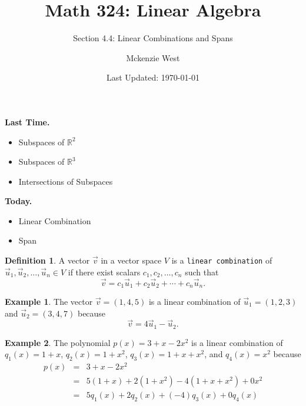 \documentclass{beamer}
\newcommand{\R}{\mathbb{R}}
\newcommand{\fn}{\insertframenumber}
\theoremstyle{definition}
\newtheorem*{defn}{Definition}
\newtheorem*{exa}{Example}
\renewcommand{\emph}[1]{{\color{blue}\texttt{#1}}}
\begin{document}
	\title{Math 324: Linear Algebra}
	\subtitle{Section 4.4: Linear Combinations and Spans}
	\author{Mckenzie West}
	\date{Last Updated: \today}
\begin{frame}
\maketitle
\end{frame}

\begin{frame}{\insertframenumber}
	\begin{block}{\textbf{Last Time.}}
	\begin{itemize}[label=--]
		\item Subspaces of $\R^2$
		\item Subspaces of $\R^3$
		\item Intersections of Subspaces
	\end{itemize}
	\end{block}
	\begin{block}{\textbf{Today.}}
		\begin{itemize}[label=--]
			\item Linear Combination
			\item Span
		\end{itemize}
	\end{block}
\end{frame}
\begin{frame}{\fn}
	\begin{defn}
		A vector $\vec v$ in a vector space $V$ is a \emph{linear combination} of $\vec u_1,\vec u_2,\dots,\vec u_n\in V$ if there exist scalars $c_1,c_2,\dots,c_n$ such that
		\[\vec v=c_1\vec u_1+c_2\vec u_2+\cdots+c_n\vec u_n.\]
	\end{defn}
	\begin{exa}
		The vector $\vec v=(1,4,5)$ is a linear combination of $\vec u_1=(1,2,3)$ and $\vec u_2 = (3,4,7)$ because
			\[\vec v = 4\vec u_1-\vec u_2.\]
	\end{exa}
\end{frame}
\begin{frame}{\fn}
	\begin{exa}
		The polynomial $p(x)=3+x-2x^2$ is a linear combination of $q_1(x)=1+x$, $q_2(x)=1+x^2$, $q_3(x)=1+x+x^2$, and $q_4(x)=x^2$ because \begin{eqnarray*}p(x)&=&3+x-2x^2\\ &=&5(1+x)+2(1+x^2)-4(1+x+x^2)+0x^2\\&=&5q_1(x)+2q_2(x)+(-4)q_3(x)+0q_4(x)\end{eqnarray*}
	\end{exa}
\end{frame}
\end{document}
